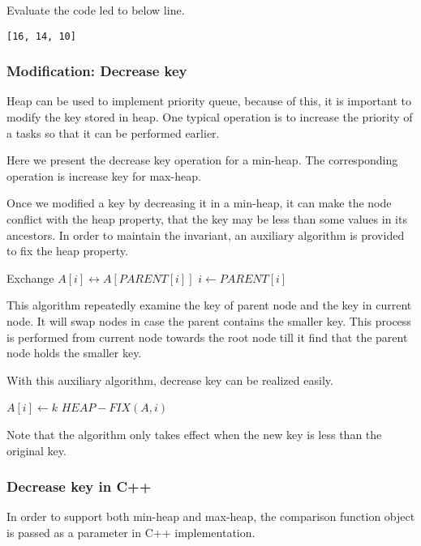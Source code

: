 \documentclass{article}
\begin{document}
Evaluate the code led to below line.

\begin{lstlisting}
[16, 14, 10]
\end{lstlisting}

\subsubsection{Modification: Decrease key}

Heap can be used to implement priority queue, because of this, it
is important to modify the key stored in heap. One typical operation
is to increase the priority of a tasks so that it can be performed
earlier.

Here we present the decrease key operation for a min-heap. The
corresponding operation is increase key for max-heap.

Once we modified a key by decreasing it in a min-heap, it can make
the node conflict with the heap property, that the key may be less
than some values in its ancestors. In order to maintain the
invariant, an auxiliary algorithm is provided to fix the heap
property.

\begin{algorithmic}[1]
    \State Exchange $A[i] \leftrightarrow A[PARENT[i]]$
    \State $i \gets PARENT[i]$
  \EndWhile
\EndFunction
\end{algorithmic}

This algorithm repeatedly examine the key of parent node and
the key in current node. It will swap nodes in case the
parent contains the smaller key. This process is performed
from current node towards the root node till it find that
the parent node holds the smaller key.

With this auxiliary algorithm, decrease key can be realized
easily.

\begin{algorithmic}[1]
    \State $A[i] \gets k$
    \State $HEAP-FIX(A, i)$
  \EndIf
\EndFunction
\end{algorithmic}

Note that the algorithm only takes effect when the new key
is less than the original key.

\subsubsection*{Decrease key in C++}
In order to support both min-heap and max-heap, the comparison
function object is passed as a parameter in C++ implementation.
\end{document}
